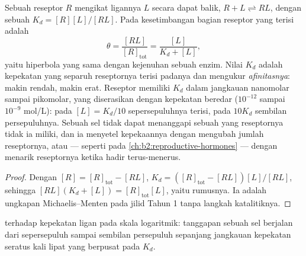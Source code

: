 \begin{theorem}\label{thm:b2:cell-signalling:occupancy}
Sebuah reseptor $R$ mengikat ligannya $L$ secara dapat balik, $R + L
\rightleftharpoons RL$, dengan sebuah \emph{} $K_d =
[R][L]/[RL]$. Pada kesetimbangan bagian reseptor yang terisi adalah
\[
\theta = \frac{[RL]}{[R]_{\text{tot}}} = \frac{[L]}{K_d + [L]},
\]
yaitu hiperbola yang sama dengan kejenuhan sebuah enzim. Nilai $K_d$
adalah kepekatan yang separuh reseptornya terisi padanya dan mengukur
\emph{afinitasnya}: makin rendah, makin erat. Reseptor  memiliki
$K_d$ dalam jangkauan nanomolar sampai pikomolar, yang diserasikan
dengan kepekatan  beredar ($10^{-12}$ sampai $10^{-9}$ mol/L):
pada $[L] = K_d/10$ sepersepuluhnya terisi, pada $10K_d$ sembilan
persepuluhnya. Sebuah sel tidak dapat menanggapi sebuah  yang
reseptornya tidak ia miliki, dan ia menyetel kepekaannya dengan
mengubah jumlah reseptornya, atau --- seperti pada
\cref{ch:b2:reproductive-hormones} --- dengan menarik reseptornya
ketika  hadir terus-menerus.
\end{theorem}
\begin{proof}
Dengan $[R] = [R]_{\text{tot}} - [RL]$, $K_d = ([R]_{\text{tot}} -
[RL])[L]/[RL]$, sehingga $[RL](K_d + [L]) = [R]_{\text{tot}}[L]$, yaitu
rumusnya. Ia adalah ungkapan Michaelis--Menten pada jilid Tahun 1 tanpa
langkah katalitiknya.
\end{proof}

\begin{omfigure}

{\small {} terhadap kepekatan ligan pada skala
logaritmik: tanggapan sebuah sel berjalan dari sepersepuluh sampai
sembilan persepuluh sepanjang jangkauan kepekatan seratus kali lipat
yang berpusat pada $K_d$.}
\end{omfigure}

